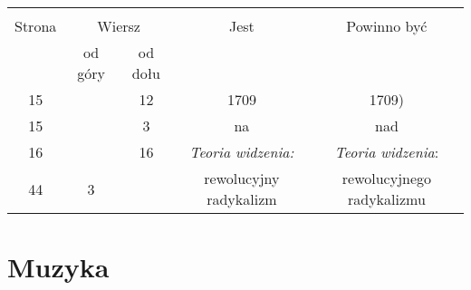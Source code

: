 \documentclass[a4paper,11pt]{article}
\begin{document}


\begin{center}

  \begin{tabular}{|c|c|c|c|c|}
    \hline
    & \multicolumn{2}{c|}{} & & \\
    Strona & \multicolumn{2}{c|}{Wiersz} & Jest
                              & Powinno być \\ \cline{2-3}
    & od góry & od dołu & & \\
    \hline
    15  & & 12 & 1709 & 1709) \\
    15  & &  3 & na & nad \\
    16  & & 16 & \emph{Teoria widzenia:} & \emph{Teoria widzenia}: \\
    44  &  3 & & rewolucyjny radykalizm & rewolucyjnego radykalizmu \\
    \hline
  \end{tabular}

\end{center}

\vspace{\spaceTwo}










\newpage
\section{Muzyka}

\vspace{\spaceTwo}








\end{document}
